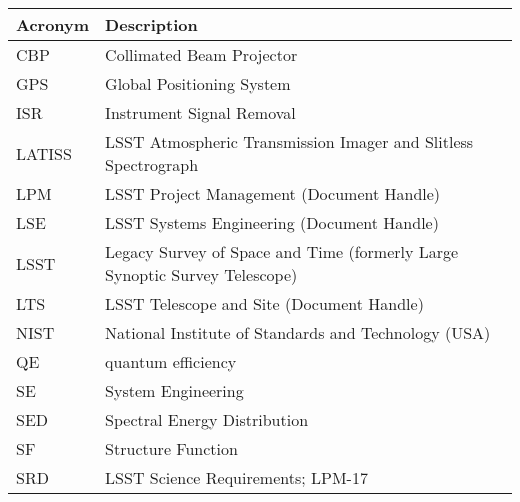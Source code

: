 \addtocounter{table}{-1}
\begin{longtable}{p{}p{}}\hline
\textbf{Acronym} & \textbf{Description}  \\\hline

CBP & Collimated Beam Projector \\\hline
GPS & Global Positioning System \\\hline
ISR & Instrument Signal Removal \\\hline
LATISS & LSST Atmospheric Transmission Imager and Slitless Spectrograph \\\hline
LPM & LSST Project Management (Document Handle) \\\hline
LSE & LSST Systems Engineering (Document Handle) \\\hline
LSST & Legacy Survey of Space and Time (formerly Large Synoptic Survey Telescope) \\\hline
LTS & LSST Telescope and Site  (Document Handle) \\\hline
NIST & National Institute of Standards and Technology (USA) \\\hline
QE & quantum efficiency \\\hline
SE & System Engineering \\\hline
SED & Spectral Energy Distribution \\\hline
SF & Structure Function \\\hline
SRD & LSST Science Requirements; LPM-17 \\\hline
\end{longtable}
